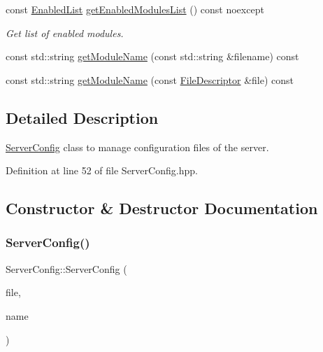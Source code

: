\begin{DoxyCompactItemize}
\item 
const \hyperlink{namespace_zia_a3076ef33a6c08b068cb8e444848ad33c}{Enabled\+List} \hyperlink{class_zia_1_1_server_config_a3ee30a0d396ff60fc7d06110005654f3}{get\+Enabled\+Modules\+List} () const noexcept
\begin{DoxyCompactList}\small\item\em Get list of enabled modules. \end{DoxyCompactList}\item 
const std\+::string \hyperlink{class_zia_1_1_server_config_a931a626c641223c2136979ef4c1aafe9}{get\+Module\+Name} (const std\+::string \&filename) const
\item 
const std\+::string \hyperlink{class_zia_1_1_server_config_a090ae222eeed278436a1fba19f5dcd6c}{get\+Module\+Name} (const \hyperlink{namespacecfg_af0aed6e47bd26e91ad7d69467f96caaf}{File\+Descriptor} \&file) const
\end{DoxyCompactItemize}


\subsection{Detailed Description}
\hyperlink{class_zia_1_1_server_config}{Server\+Config} class to manage configuration files of the server. 

Definition at line 52 of file Server\+Config.\+hpp.



\subsection{Constructor \& Destructor Documentation}
\mbox{\label{class_zia_1_1_server_config_a1a98af732891f93c29f588b5377d4cb2}} 
\subsubsection{\texorpdfstring{Server\+Config()}{ServerConfig()}}
{\footnotesize\ttfamily Server\+Config\+::\+Server\+Config (\begin{DoxyParamCaption}\item[{const \hyperlink{namespacecfg_af0aed6e47bd26e91ad7d69467f96caaf}{File\+Descriptor} \&}]{file,  }\item[{const std\+::string \&}]{name }\end{DoxyParamCaption})}



